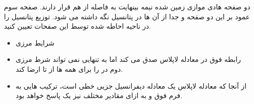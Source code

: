 \begin{ELexample}{}

دو صفحه هادی موازی زمین شده نیمه بینهایت به فاصله  از هم قرار دارند. صفحه سوم عمود بر این دو صفحه و جدا از آن ها در پتانسیل  نگه داشته می شود. توزیع پتانسیل را در ناحیه احاطه شده توسط این صفحات تعیین کنید.


\begin{ELsolution}

\begin{itemize}
\tightlist
\item
  شرایط مرزی
\end{itemize}



\begin{itemize}
\tightlist
\item
  رابطه فوق در معادله لاپلاس صدق می کند اما به تنهایی نمی تواند شرط مرزی دوم در  را برای همه  ها از  تا  ارضا کند.
\item
  از آنجا که معادله لاپلاس یک معادله دیفرانسیل جزیی خطی است، ترکیب  هایی به فرم فوق و به ازای مقادیر مختلف  نیز یک پاسخ خواهد بود.
\end{itemize}


\end{ELsolution}
\end{ELexample}
